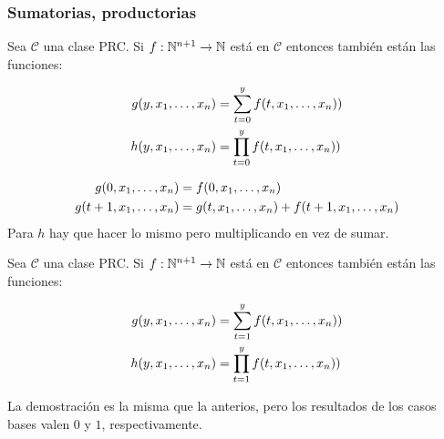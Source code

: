 \subsubsection{Sumatorias, productorias}\label{sec::primitivas::sumatoria}

\begin{teorema}
Sea $\mathcal{C}$ una clase PRC. Si $f:\mathbb{N}^{n+1}\to\mathbb{N}$ está en $\mathcal{C}$ entonces también están las funciones:

\begin{align*}
	g(y,x_1,\dots, x_{n}) &= \sum_{t=0}^{y} f(t,x_1,\dots, x_{n})) \\
	h(y,x_1,\dots, x_{n}) &= \prod_{t=0}^{y} f(t,x_1,\dots, x_{n})) \\
\end{align*}

\end{teorema}

\begin{demo}
	\vspace*{-0.5cm}
\begin{align*}
	g(0,x_1,\dots, x_{n}) &= f(0, x_1,\dots, x_{n}) \\
	g(t+1,x_1,\dots, x_{n}) &= g(t, x_1,\dots, x_{n}) + f(t+1, x_1,\dots, x_{n})
\end{align*}
Para $h$ hay que hacer lo mismo pero multiplicando en vez de sumar.
\end{demo}

\begin{teorema}
Sea $\mathcal{C}$ una clase PRC. Si $f:\mathbb{N}^{n+1}\to\mathbb{N}$ está en $\mathcal{C}$ entonces también están las funciones:

\begin{align*}
	g(y,x_1,\dots, x_{n}) &= \sum_{t=1}^{y} f(t,x_1,\dots, x_{n})) \\
	h(y,x_1,\dots, x_{n}) &= \prod_{t=1}^{y} f(t,x_1,\dots, x_{n})) \\
\end{align*}

\end{teorema}

La demostración es la misma que la anterios, pero los resultados de los casos bases valen $0$ y $1$, respectivamente.

